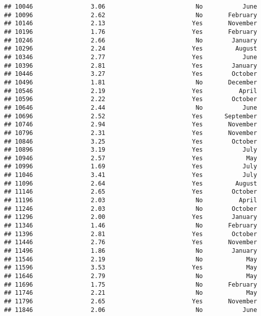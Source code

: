 \documentclass[
]{article}
\begin{document}
\begin{verbatim}
## 10046                3.06                         No           June
## 10096                2.62                         No       February
## 10146                2.13                        Yes       November
## 10196                1.76                        Yes       February
## 10246                2.66                         No        January
## 10296                2.24                        Yes         August
## 10346                2.77                        Yes           June
## 10396                2.81                        Yes        January
## 10446                3.27                        Yes        October
## 10496                1.81                         No       December
## 10546                2.19                        Yes          April
## 10596                2.22                        Yes        October
## 10646                2.44                         No           June
## 10696                2.52                        Yes      September
## 10746                2.94                        Yes       November
## 10796                2.31                        Yes       November
## 10846                3.25                        Yes        October
## 10896                3.19                        Yes           July
## 10946                2.57                        Yes            May
## 10996                1.69                        Yes           July
## 11046                3.41                        Yes           July
## 11096                2.64                        Yes         August
## 11146                2.65                        Yes        October
## 11196                2.03                         No          April
## 11246                2.03                         No        October
## 11296                2.00                        Yes        January
## 11346                1.46                         No       February
## 11396                2.81                        Yes        October
## 11446                2.76                        Yes       November
## 11496                1.86                         No        January
## 11546                2.19                         No            May
## 11596                3.53                        Yes            May
## 11646                2.79                         No            May
## 11696                1.75                         No       February
## 11746                2.21                         No            May
## 11796                2.65                        Yes       November
## 11846                2.06                         No           June

\end{verbatim}
\end{document}
